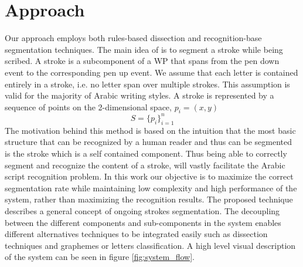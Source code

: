 \documentclass[journal,compsoc]{IEEEtran}
\begin{document}
\section{Approach}
\label{sec:approach}
Our approach employs both rules-based dissection and recognition-base segmentation techniques. The main idea of is to  segment a stroke while being scribed. A stroke is a subcomponent of a WP that spans from the pen down event to the corresponding pen up event. We assume that each letter is contained entirely in a stroke, i.e. no letter span over multiple strokes. This assumption is valid for the majority of Arabic writing styles. 
A stroke is represented by a sequence of points on the 2-dimensional space, $p_{i}=(x,y)$ 
\begin{equation}
S=\{p_{i}\}_{i=1}^{n}
\end{equation}
The motivation behind this method is based on the intuition that the most basic structure that can be recognized by a human reader and thus can be segmented is the stroke which is a self contained component. Thus being able to correctly segment and recognize the content of a stroke, will vastly facilitate the Arabic script recognition problem. In this work our objective is to maximize the correct segmentation rate while maintaining low complexity and high performance of the system, rather than maximizing the recognition results. 
The proposed technique describes a general concept of ongoing strokes segmentation. The decoupling between the different components and sub-components in the system enables different alternatives techniques to be integrated easily such as dissection techniques and graphemes or letters classification. A high level visual description of the system can be seen in figure \ref{fig:system_flow}.\\
\end{document}
